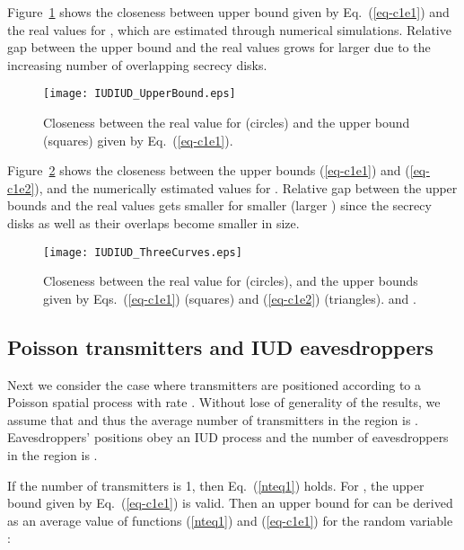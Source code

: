 \documentclass[conference,a4paper]{IEEEtran}
\begin{document}
Figure~\ref{fig-IUDIUD_UpperBound} shows the closeness between upper bound given by Eq.~(\ref{eq-c1e1}) and the real values for , which are estimated through numerical simulations.
Relative gap between the upper bound and the real values grows for larger  due to the increasing number of overlapping secrecy disks.
\begin{figure}[htbp]
\centering
\texttt{[image: IUDIUD\_UpperBound.eps]}
\caption{Closeness between the real value for   (circles) and the upper bound (squares) given by Eq.~(\ref{eq-c1e1}).}
\label{fig-IUDIUD_UpperBound}
\end{figure}

Figure~\ref{fig-IUDIUD_ThreeCurves} shows the closeness between the upper bounds (\ref{eq-c1e1}) and (\ref{eq-c1e2}), and the numerically estimated values for .
Relative  gap between the upper bounds and the real values gets smaller for smaller  (larger ) since the secrecy disks as well as their overlaps become smaller in size.
\begin{figure}[htbp]
\centering
\texttt{[image: IUDIUD\_ThreeCurves.eps]}
\caption{Closeness between the real value for  (circles), and  the upper bounds given by Eqs.~(\ref{eq-c1e1}) (squares) and (\ref{eq-c1e2}) (triangles).  and . }
\label{fig-IUDIUD_ThreeCurves}
\end{figure}

\subsection{Poisson transmitters and IUD eavesdroppers}\label{sec-PoissonTxIUDE}
Next we consider the case where transmitters are positioned according to a Poisson spatial process with rate .
Without lose of generality of the results, we assume that  and thus the average number of transmitters in the region  is .
Eavesdroppers' positions obey an IUD process and the number of eavesdroppers in the region  is .

If the number of transmitters  is 1, then Eq.~(\ref{nteq1}) holds.
For , the upper bound given by Eq.~(\ref{eq-c1e1}) is valid.
Then an upper bound for  can be derived as an average value of functions (\ref{nteq1}) and (\ref{eq-c1e1}) for the random variable :
\end{document}
